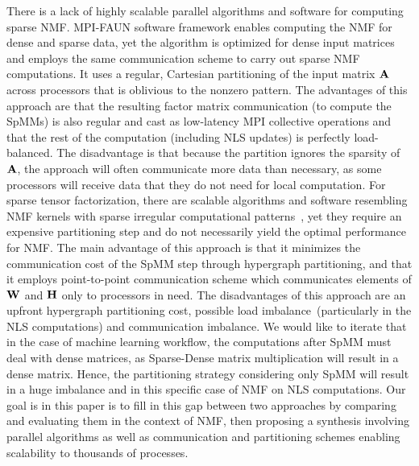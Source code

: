 There is a lack of highly scalable parallel algorithms and software for computing sparse NMF.
MPI-FAUN \cite{KBP17} software framework enables computing the NMF for dense and sparse data, yet the algorithm is optimized for dense input matrices and employs the same communication scheme to carry out sparse NMF computations.
It uses a regular, Cartesian partitioning of the input matrix $\AA$ across processors that is oblivious to the nonzero pattern.
The advantages of this approach are that the resulting factor matrix communication (to compute the SpMMs) is also regular and cast as low-latency MPI collective operations and that the rest of the computation (including NLS updates) is perfectly load-balanced.
The disadvantage is that because the partition ignores the sparsity of $\AA$, the approach will often communicate more data than necessary, as some processors will receive data that they do not need for local computation.
For sparse tensor factorization, there are scalable algorithms and software resembling NMF kernels with sparse irregular computational patterns~\cite{KU15}, yet they require an expensive partitioning step and do not necessarily yield the optimal performance for NMF.
The main advantage of this approach is that it minimizes the communication cost of the SpMM step through hypergraph partitioning, and that it employs point-to-point communication scheme which communicates elements of $\WW$ and $\HH$ only to processors in need.
The disadvantages of this approach are an upfront hypergraph partitioning cost, possible load imbalance~(particularly in the NLS 
computations) and communication imbalance. We would like to iterate that in the case of machine learning workflow, the 
computations after SpMM must deal with dense matrices, as Sparse-Dense matrix multiplication will result in a dense matrix. 
Hence, the partitioning strategy considering only SpMM will result in a huge imbalance and in this specific case of NMF on NLS computations. 
Our goal is in this paper is to fill in this gap between two approaches by comparing and evaluating them in the context of NMF, then proposing a synthesis involving parallel algorithms as well as communication and partitioning schemes enabling scalability to thousands of processes.

